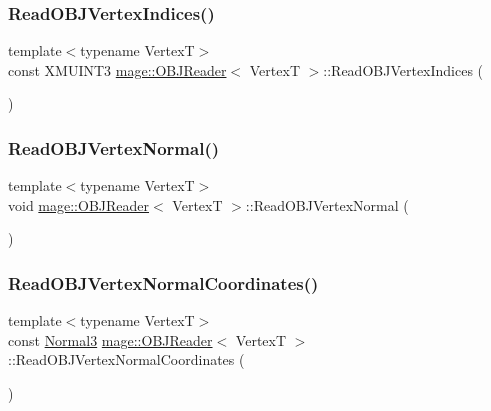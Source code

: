 \subsubsection{\texorpdfstring{Read\+O\+B\+J\+Vertex\+Indices()}{ReadOBJVertexIndices()}}
{\footnotesize\ttfamily template$<$typename VertexT$>$ \\
const X\+M\+U\+I\+N\+T3 \hyperlink{classmage_1_1_o_b_j_reader}{mage\+::\+O\+B\+J\+Reader}$<$ VertexT $>$\+::Read\+O\+B\+J\+Vertex\+Indices (\begin{DoxyParamCaption}{ }\end{DoxyParamCaption})\hspace{0.3cm}{\ttfamily [private]}}

\hypertarget{classmage_1_1_o_b_j_reader_aa9ef2ced0ad787b13818722c7dfa0636}{}\label{classmage_1_1_o_b_j_reader_aa9ef2ced0ad787b13818722c7dfa0636} 
\subsubsection{\texorpdfstring{Read\+O\+B\+J\+Vertex\+Normal()}{ReadOBJVertexNormal()}}
{\footnotesize\ttfamily template$<$typename VertexT$>$ \\
void \hyperlink{classmage_1_1_o_b_j_reader}{mage\+::\+O\+B\+J\+Reader}$<$ VertexT $>$\+::Read\+O\+B\+J\+Vertex\+Normal (\begin{DoxyParamCaption}{ }\end{DoxyParamCaption})\hspace{0.3cm}{\ttfamily [private]}}

\hypertarget{classmage_1_1_o_b_j_reader_a2be022b43cf2ad848c7a2d013b16e5f2}{}\label{classmage_1_1_o_b_j_reader_a2be022b43cf2ad848c7a2d013b16e5f2} 
\subsubsection{\texorpdfstring{Read\+O\+B\+J\+Vertex\+Normal\+Coordinates()}{ReadOBJVertexNormalCoordinates()}}
{\footnotesize\ttfamily template$<$typename VertexT$>$ \\
const \hyperlink{structmage_1_1_normal3}{Normal3} \hyperlink{classmage_1_1_o_b_j_reader}{mage\+::\+O\+B\+J\+Reader}$<$ VertexT $>$\+::Read\+O\+B\+J\+Vertex\+Normal\+Coordinates (\begin{DoxyParamCaption}{ }\end{DoxyParamCaption})\hspace{0.3cm}{\ttfamily [private]}}

